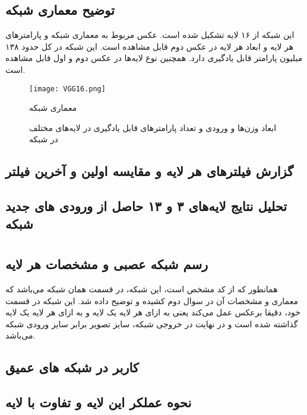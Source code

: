 \documentclass{article}
\begin{document}
\subsection{توضیح معماری شبکه }
این شبکه از ۱۶ لایه تشکیل شده است. عکس مربوط به معماری شبکه و پارامتر‌های هر لایه و ابعاد هر لایه در عکس دوم قابل مشاهده است. این شبکه در کل حدود ۱۳۸ میلیون 
پارامتر قابل یادگیری دارد. همچنین نوع لایه‌ها در عکس دوم و اول قابل مشاهده است.
\begin{figure}[H]
	\centerline{\texttt{[image: VGG16.png]}}
	\caption{معماری شبکه }
\end{figure}
\begin{figure}[H]
	\centering
	\caption {ابعاد وزن‌ها و ورودی و تعداد پارامتر‌های قابل یادگیری در لایه‌های مختلف در شبکه }
\end{figure}
\subsection{گزارش فیلتر‌های هر لایه و مقایسه اولین و آخرین فیلتر}
\subsection{تحلیل نتایج لایه‌های ۳ و ۱۳ حاصل از ورودی های جدید شبکه}
\section{}
\subsection{رسم شبکه عصبی و مشخصات هر لایه}
همانطور که از کد مشخص است، این شبکه، در قسمت  همان شبکه  می‌باشد که معماری و مشخصات آن در سوال دوم کشیده و توضیح داده شد. این شبکه در قسمت  خود، دقیقا برعکس  عمل می‌کند یعنی به ازای هر لایه  یک لایه  و به ازای هر لایه  یک لایه  گذاشته شده است و در نهایت در خروجی شبکه، سایز تصویر برابر سایز ورودی شبکه می‌باشد.
\subsection{کاربر در شبکه های عمیق}
\subsection{نحوه عملکر این لایه و تفاوت با لایه }
\end{document}
